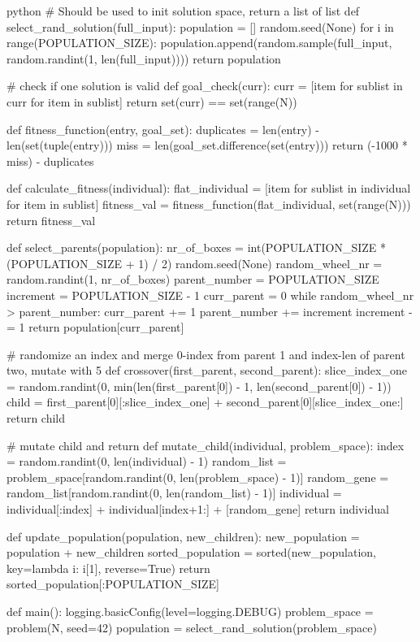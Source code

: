 \begin{mintedbox}{python}
# Should be used to init solution space, return a list of list
def select_rand_solution(full_input):
    population = []
    random.seed(None)
    for i in range(POPULATION_SIZE):
        population.append(random.sample(full_input, random.randint(1, len(full_input))))
    return population


# check if one solution is valid
def goal_check(curr):
    curr = [item for sublist in curr for item in sublist]
    return set(curr) == set(range(N))


def fitness_function(entry, goal_set):
    duplicates = len(entry) - len(set(tuple(entry)))
    miss = len(goal_set.difference(set(entry)))
    return (-1000 * miss) - duplicates


def calculate_fitness(individual):
    flat_individual = [item for sublist in individual for item in sublist]
    fitness_val = fitness_function(flat_individual, set(range(N)))
    return fitness_val


def select_parents(population):
    nr_of_boxes = int(POPULATION_SIZE * (POPULATION_SIZE + 1) / 2)
    random.seed(None)
    random_wheel_nr = random.randint(1, nr_of_boxes)
    parent_number = POPULATION_SIZE
    increment = POPULATION_SIZE - 1
    curr_parent = 0
    while random_wheel_nr > parent_number:
        curr_parent += 1
        parent_number += increment
        increment -= 1
    return population[curr_parent]


# randomize an index and merge 0-index from parent 1 and index-len of parent two, mutate with 5%
def crossover(first_parent, second_parent):
    slice_index_one = random.randint(0, min(len(first_parent[0]) - 1, len(second_parent[0]) - 1))
    child = first_parent[0][:slice_index_one] + second_parent[0][slice_index_one:]
    return child


# mutate child and return
def mutate_child(individual, problem_space):
    index = random.randint(0, len(individual) - 1)
    random_list = problem_space[random.randint(0, len(problem_space) - 1)]
    random_gene = random_list[random.randint(0, len(random_list) - 1)]
    individual = individual[:index] + individual[index+1:] + [random_gene]
    return individual


def update_population(population, new_children):
    new_population = population + new_children
    sorted_population = sorted(new_population, key=lambda i: i[1], reverse=True)
    return sorted_population[:POPULATION_SIZE]


def main():
    logging.basicConfig(level=logging.DEBUG)
    problem_space = problem(N, seed=42)
    population = select_rand_solution(problem_space)


\end{mintedbox}
